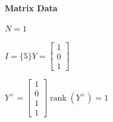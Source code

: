 \documentclass[11pt]{article}
\begin{document}
\noindent\textbf{Matrix Data}
\par $N=1$
\par $I=\{5\}$\quad$Y=\begin{bmatrix}1 \\ 0 \\ 1\end{bmatrix}$
\par $Y^{+}=\begin{bmatrix}1 \\ 0 \\ 1 \\ 1\end{bmatrix}$\quad$\operatorname{rank}(Y^{+})=1$
\end{document}
